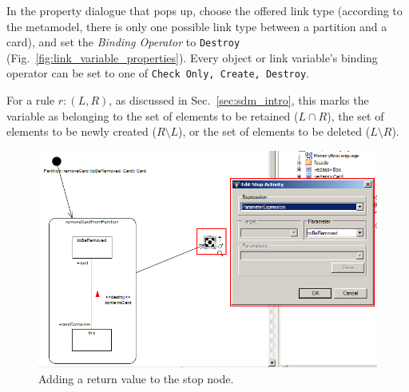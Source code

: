 In the property dialogue that pops up, choose the offered link type (according
to the metamodel, there is only one possible link type between a partition and a
card), and set the \emph{Binding Operator} to \texttt{Destroy}
(Fig.~\ref{fig:link_variable_properties}). Every object or link variable's
binding operator can be set to one of \texttt{Check Only, Create, Destroy}. 

For a rule $r: (L, R)$, as discussed in Sec.~\ref{sec:sdm_intro}, this marks the
variable as belonging to the set of elements to be retained ($L\cap R$), the set
of elements to be newly created ($R\setminus L$), or the set of elements to be
deleted ($L\setminus R$).

\begin{figure}[htp]
\begin{center}
  \includegraphics[width=\textwidth]{pics/sdmBilder/removeCard/sdm14RAW}
  \caption{Adding a return value to the stop node.}  
  \label{fig:stop_node_return_value}
\end{center}
\end{figure}
 
